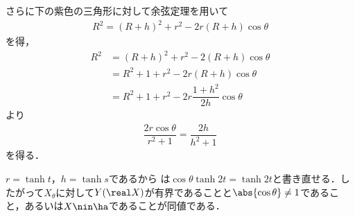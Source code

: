 \begin{npfwn}
  さらに下の紫色の三角形に対して余弦定理を用いて
  \begin{align*}
    {R^2 = (R+h)^2 + r^2 - 2r(R+h)\cos\theta }
  \end{align*}
  を得，
  \begin{align*}
    R^2 &= (R+h)^2 + r^2 - 2(R+h) \cos\theta \\
        &= R^2 +  1 + r^2 - 2r(R+h) \cos\theta \\
        &= R^2 +  1 + r^2 - 2r\dfrac{1+h^2}{2h} \cos\theta  
  \end{align*}
  より
  \begin{align}
    {\dfrac{2r\cos\theta}{r^2 + 1} = \dfrac{2h}{h^2 + 1} }\label{eq:1018-main}
  \end{align}
  を得る．

  $r = \tanh t$，$h = \tanh s$であるから は$\cos\theta \tanh 2t = \tanh 2t $と書き直せる．したがって$X_{\theta}$に対して$Y(\real X) $が有界であることと$ \abs{\cos\theta}\neq 1 $であること，あるいは$ X\nin \ha  $であることが同値である．
\end{npfwn}

